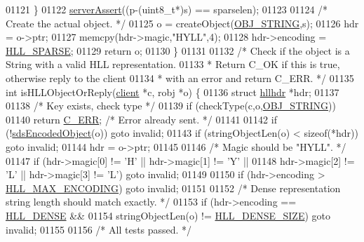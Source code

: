 \begin{DoxyCode}
{{01121     \}
01122     \hyperlink{server_8h_a88114b5169b4c382df6b56506285e56a}{serverAssert}((p-(uint8\_t*)s) == sparselen);
01123 
01124     \textcolor{comment}{/* Create the actual object. */}
01125     o = createObject(\hyperlink{server_8h_a65236ea160f69cdef33ec942092af88f}{OBJ\_STRING},s);
01126     hdr = o->ptr;
01127     memcpy(hdr->magic,\textcolor{stringliteral}{"HYLL"},4);
01128     hdr->encoding = \hyperlink{hyperloglog_8c_afe326d57dd3d7c27c8fe52dc2c19cecd}{HLL\_SPARSE};
01129     \textcolor{keywordflow}{return} o;
01130 \}
01131 
01132 \textcolor{comment}{/* Check if the object is a String with a valid HLL representation.}
01133 \textcolor{comment}{ * Return C\_OK if this is true, otherwise reply to the client}
01134 \textcolor{comment}{ * with an error and return C\_ERR. */}
01135 \textcolor{keywordtype}{int} isHLLObjectOrReply(\hyperlink{structclient}{client} *c, robj *o) \{
01136     \textcolor{keyword}{struct} \hyperlink{structhllhdr}{hllhdr} *hdr;
01137 
01138     \textcolor{comment}{/* Key exists, check type */}
01139     \textcolor{keywordflow}{if} (checkType(c,o,\hyperlink{server_8h_a65236ea160f69cdef33ec942092af88f}{OBJ\_STRING}))
01140         \textcolor{keywordflow}{return} \hyperlink{server_8h_af98ac28d5f4d23d7ed5985188e6fb7d1}{C\_ERR}; \textcolor{comment}{/* Error already sent. */}
01141 
01142     \textcolor{keywordflow}{if} (!\hyperlink{server_8h_afcfb5bd97af52d1dbce331745cae030c}{sdsEncodedObject}(o)) \textcolor{keywordflow}{goto} invalid;
01143     \textcolor{keywordflow}{if} (stringObjectLen(o) < \textcolor{keyword}{sizeof}(*hdr)) \textcolor{keywordflow}{goto} invalid;
01144     hdr = o->ptr;
01145 
01146     \textcolor{comment}{/* Magic should be "HYLL". */}
01147     \textcolor{keywordflow}{if} (hdr->magic[0] != \textcolor{stringliteral}{'H'} || hdr->magic[1] != \textcolor{stringliteral}{'Y'} ||
01148         hdr->magic[2] != \textcolor{stringliteral}{'L'} || hdr->magic[3] != \textcolor{stringliteral}{'L'}) \textcolor{keywordflow}{goto} invalid;
01149 
01150     \textcolor{keywordflow}{if} (hdr->encoding > \hyperlink{hyperloglog_8c_ae5c2b03f2019eb1c3fb9497ca8f3e8f3}{HLL\_MAX\_ENCODING}) \textcolor{keywordflow}{goto} invalid;
01151 
01152     \textcolor{comment}{/* Dense representation string length should match exactly. */}
01153     \textcolor{keywordflow}{if} (hdr->encoding == \hyperlink{hyperloglog_8c_a5f2ead2492fc9cc4ff39f8c1752875a1}{HLL\_DENSE} &&
01154         stringObjectLen(o) != \hyperlink{hyperloglog_8c_ad677821a745c7306ef02ccca0ff6f92f}{HLL\_DENSE\_SIZE}) \textcolor{keywordflow}{goto} invalid;
01155 
01156     \textcolor{comment}{/* All tests passed. */}
}}
\end{DoxyCode}
